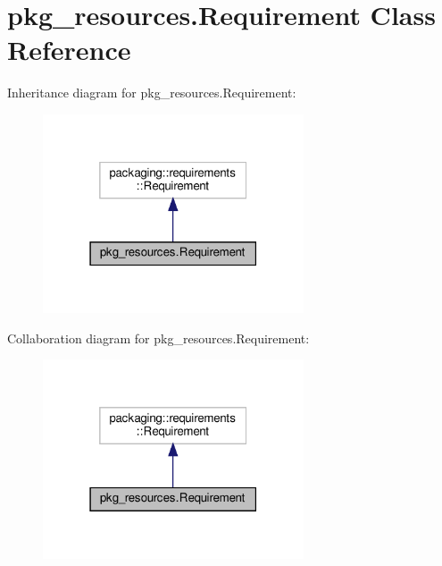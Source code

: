 \hypertarget{classpkg__resources_1_1Requirement}{}\section{pkg\+\_\+resources.\+Requirement Class Reference}
\label{classpkg__resources_1_1Requirement}


Inheritance diagram for pkg\+\_\+resources.\+Requirement\+:
\nopagebreak
\begin{figure}[H]
\begin{center}
\leavevmode
\includegraphics[width=219pt]{classpkg__resources_1_1Requirement__inherit__graph}
\end{center}
\end{figure}


Collaboration diagram for pkg\+\_\+resources.\+Requirement\+:
\nopagebreak
\begin{figure}[H]
\begin{center}
\leavevmode
\includegraphics[width=219pt]{classpkg__resources_1_1Requirement__coll__graph}
\end{center}
\end{figure}
